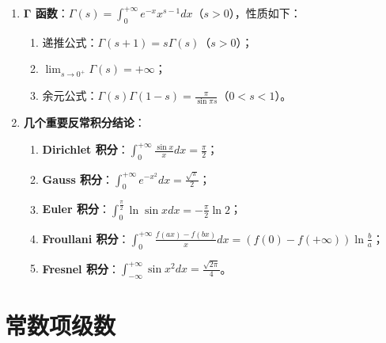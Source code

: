 \documentclass[UTF8]{ctexart}
\theoremstyle{remark}
\begin{document}
\begin{enumerate}
	\item \textbf{Γ 函数}：\(\Gamma(s) = \int_{0}^{+\infty} e^{-x}x^{s-1} dx\)（\(s > 0\)），性质如下：
	\begin{enumerate}
		\item 递推公式：\(\Gamma(s+1) = s\Gamma(s)\)（\(s > 0\)）；
		\item \(\lim_{s \to 0^+} \Gamma(s) = +\infty\)；
		\item 余元公式：\(\Gamma(s)\Gamma(1-s) = \frac{\pi}{\sin \pi s}\)（\(0 < s < 1\)）。
	\end{enumerate}
	
	\item \textbf{几个重要反常积分结论}：
	\begin{enumerate}
		\item \textbf{Dirichlet 积分}：\(\int_{0}^{+\infty} \frac{\sin x}{x} dx = \frac{\pi}{2}\)；
		\item \textbf{Gauss 积分}：\(\int_{0}^{+\infty} e^{-x^2} dx = \frac{\sqrt{\pi}}{2}\)；
		\item \textbf{Euler 积分}：\(\int_{0}^{\frac{\pi}{2}} \ln \sin x dx = -\frac{\pi}{2} \ln 2\)；
		\item \textbf{Froullani 积分}：\(\int_{0}^{+\infty} \frac{f(ax)-f(bx)}{x} dx = (f(0)-f(+\infty))\ln \frac{b}{a}\)；
		\item \textbf{Fresnel 积分}：\(\int_{-\infty}^{+\infty} \sin x^2 dx = \frac{\sqrt{2\pi}}{4}\)。
	\end{enumerate}
\end{enumerate}

\section{常数项级数}
\end{document}
